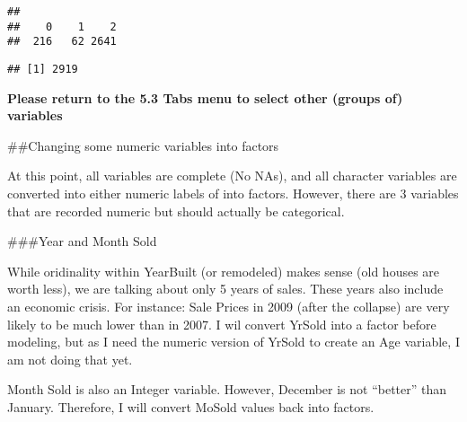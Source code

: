 \documentclass[]{article}
\newenvironment{Shaded}{\begin{snugshade}}{\end{snugshade}}
\newcommand{\CommentTok}[1]{\textcolor[rgb]{0.56,0.35,0.01}{\textit{#1}}}
\newcommand{\DecValTok}[1]{\textcolor[rgb]{0.00,0.00,0.81}{#1}}
\newcommand{\KeywordTok}[1]{\textcolor[rgb]{0.13,0.29,0.53}{\textbf{#1}}}
\newcommand{\NormalTok}[1]{#1}
\newcommand{\OperatorTok}[1]{\textcolor[rgb]{0.81,0.36,0.00}{\textbf{#1}}}
\newcommand{\StringTok}[1]{\textcolor[rgb]{0.31,0.60,0.02}{#1}}
\begin{document}
\begin{Shaded}
\end{Shaded}

\begin{verbatim}
## 
##    0    1    2 
##  216   62 2641
\end{verbatim}

\begin{Shaded}
\end{Shaded}

\begin{verbatim}
## [1] 2919
\end{verbatim}

\textbf{Please return to the 5.3 Tabs menu to select other (groups of)
variables}

\#\#Changing some numeric variables into factors

At this point, all variables are complete (No NAs), and all character
variables are converted into either numeric labels of into factors.
However, there are 3 variables that are recorded numeric but should
actually be categorical.

\#\#\#Year and Month Sold

While oridinality within YearBuilt (or remodeled) makes sense (old
houses are worth less), we are talking about only 5 years of sales.
These years also include an economic crisis. For instance: Sale Prices
in 2009 (after the collapse) are very likely to be much lower than in
2007. I wil convert YrSold into a factor before modeling, but as I need
the numeric version of YrSold to create an Age variable, I am not doing
that yet.

Month Sold is also an Integer variable. However, December is not
``better'' than January. Therefore, I will convert MoSold values back
into factors.
\end{document}
